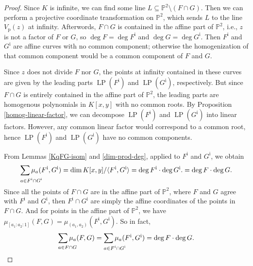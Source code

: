 \documentclass[12pt]{article}
\makeatletter
\theoremstyle{definition}
\newcommand{\<}{\langle}
\renewcommand{\>}{\rangle}
\renewcommand{\P}{\mathbb{P}}
\newcommand{\Vp}{V_{\mathrm{p}}}
\newcommand{\longlimit}[2]{
    {
        \def\arraystretch{0}
        \begin{array}[t]{@{}l@{}}
            \displaystyle{#2} \\[8.5pt] \scriptstyle{#1}
        \end{array}
    }
}
\newcommand{\longsum}[2]{\longlimit{#1}{\sum #2}}
\DeclareMathOperator{\LP}{LP}
\newcommand{\ui}{\mathrm{i}}
\makeatother
\begin{document}
\begin{proof}
    Since $K$ is infinite, we can find some line $L \subseteq \P^2 \setminus (F \cap G)$. Then we can perform a projective coordinate transformation on $\P^2$, which sends $L$ to the line $\Vp(z)$ at infinity. Afterwords, $F \cap G$ is contained in the affine part of $\P^2$, i.e., $z$ is not a factor of $F$ or $G$, so $\deg F = \deg F^\ui$ and $\deg G = \deg G^\ui$. Then $F^\ui$ and $G^\ui$ are affine curves with no common component; otherwise the homogenization of that common component would be a common component of $F$ and $G$.

    Since $z$ does not divide $F$ nor $G$, the points at infinity contained in these curves are given by the leading parts $\LP(F^\ui)$ and $\LP(G^\ui)$, respectively. But since $F \cap G$ is entirely contained in the affine part of $\P^2$, the leading parts are homogenous polynomials in $K[x, y]$ with no common roots. By Proposition \ref{homog-linear-factor}, we can decompose $\LP(F^\ui)$ and $\LP(G^\ui)$ into linear factors. However, any common linear factor would correspond to a common root, hence $\LP(F^\ui)$ and $\LP(G^\ui)$ have no common components.

    From Lemmas \ref{KqFG-isom} and \ref{dim-prod-deg}, applied to $F^\ui$ and $G^\ui$, we obtain
    \[
        \longsum{a \in F^\ui \cap G^\ui}{\mu_a(F^\ui, G^\ui)}
            = \dim K[x, y] / \<F^\ui, G^\ui\> 
            = \deg F^\ui \cdot \deg G^\ui.
            = \deg F \cdot \deg G.
    \]
    Since all the points of $F \cap G$ are in the affine part of $\P^2$, where $F$ and $G$ agree with $F^\ui$ and $G^\ui$, then $F^\ui \cap G^\ui$ are simply the affine coordinates of the points in $F \cap G$. And for points in the affine part of $\P^2$, we have $\mu_{[a_1 : a_2 : 1]}(F, G) = \mu_{(a_1, a_2)}(F^\ui, G^\ui)$. So in fact,
    \[
        \longsum{a \in F \cap G}{\mu_a(F, G)}
            = \longsum{a \in F^\ui \cap G^\ui}{\mu_a(F^\ui, G^\ui)}
            = \deg F \cdot \deg G.
    \]

\end{proof}
\end{document}
